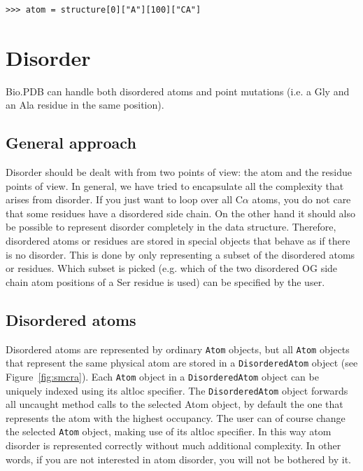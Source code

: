 \begin{verbatim}
>>> atom = structure[0]["A"][100]["CA"]
\end{verbatim}

\section{Disorder}

Bio.PDB can handle both disordered atoms and point mutations (i.e. a
Gly and an Ala residue in the same position).

\subsection{General approach}
\label{sec:disorder_problems}

Disorder should be dealt with from two points of view: the atom and the residue
points of view. In general, we have tried to encapsulate all the complexity that
arises from disorder. If you just want to loop over all C$\alpha$ atoms,
you do not care that some residues have a disordered side chain. On the other
hand it should also be possible to represent disorder completely in the data
structure. Therefore, disordered atoms or residues are stored in special objects
that behave as if there is no disorder. This is done by only representing a
subset of the disordered atoms or residues. Which subset is picked (e.g. which
of the two disordered OG side chain atom positions of a Ser residue is used)
can be specified by the user.

\subsection{Disordered atoms}
\label{sec:disordered_atoms}

Disordered atoms are represented by ordinary \texttt{Atom} objects, but
all \texttt{Atom} objects that represent the same physical atom are stored
in a \texttt{Disordered\-Atom} object (see Figure~\ref{fig:smcra}).
Each \texttt{Atom} object in a \texttt{Disordered\-Atom} object can
be uniquely indexed using its altloc specifier. The \texttt{Disordered\-Atom}
object forwards all uncaught method calls to the selected Atom object,
by default the one that represents the atom with the highest
occupancy. The user can of course change the selected \texttt{Atom}
object, making use of its altloc specifier. In this way atom disorder
is represented correctly without much additional complexity. In other
words, if you are not interested in atom disorder, you will not be
bothered by it.

